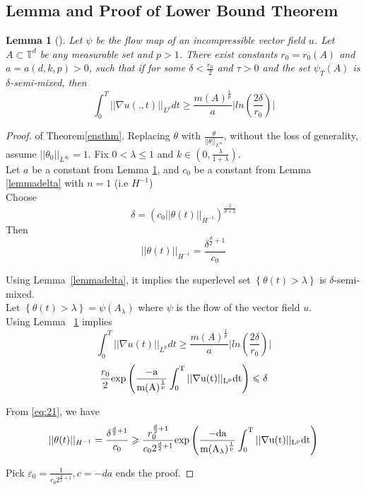 \documentclass[12pt]{report}   %
\renewcommand{\leq}{\leqslant}
\renewcommand{\geq}{\geqslant}
\renewcommand{\epsilon}{\varepsilon}
\numberwithin{equation}{section}
\theoremstyle{plain}
\newtheorem{lemma}{Lemma}[section]
\theoremstyle{definition}
\theoremstyle{remark}
\begin{document}
\subsection{\textbf{Lemma and Proof of Lower Bound Theorem}}
\begin{lemma}[{\cite[Lemma~2.3]{IyerKiselevEA14}}]\label{lemlower}Let $\psi$ be the flow map of an incompressible vector field $u$.
       Let $A\subset\mathbb{T}^d$ be any measurable set and $p > 1$. There exist constants $r_0 = r_0(A)$ and $a = a(d, k, p) > 0$, such that if for some $\delta <\frac{r_0}{2}$ and $\tau > 0$  and the set  $\psi_T{ (A)}$ is $\delta$-semi-mixed, then
       \begin{equation}
       \int_0^T ||\nabla u(.,t)||_{L^p} dt \geq \frac{m(A)^\frac{1}{p}}{a}\biggl\lvert ln\left(\frac{2\delta}{r_0}\right)\biggr\rvert
       \end{equation}
\end{lemma}
\begin{proof}  of  Theorem\ref{ensthm}.
       Replacing $\theta$ with $\frac{\theta}{||\theta||_{L^\infty}}$, without the loss of generality,
       assume $||\theta_0||_{L^\infty} = 1$. Fix $0<\lambda\leq 1$ and $k\in\left(0, \frac{\lambda}{1+\lambda}\right).$ \\
       Let $a$ be a constant from Lemma \ref{lemlower}, and $c_0$ be a constant from Lemma \ref{lemmadelta} with $n = 1$ (i.e $H^{-1}$) \\
       Choose \\
      \[ \delta = (c_0||\theta(t)||_{H^{-1}})^{\frac{2}{d+2}}\]
   Then 
  \begin{equation} 
   ||\theta(t)||_{H^{-1}} = \frac{\delta^{\frac{d}{2}+1}}{c_0} \label{eq:21}
   \end{equation}
   
   Using Lemma~\ref{lemmadelta}, it implies the superlevel set $\left\lbrace \theta(t) > \lambda \right\rbrace$ is $\delta$-semi-mixed.  \\
  Let $\left\lbrace \theta(t) > \lambda \right\rbrace = \psi(A_\lambda)$ where $\psi$ is the flow of the vector field $u$. \\
  Using Lemma ~\ref{lemlower} implies
   \[\int_0^T ||\nabla u(t)||_{L^p} dt \geq \frac{m(A)^\frac{1}{p}}{a}\biggl\lvert ln\left(\frac{2\delta}{r_0}\right)\biggr\rvert\]
   \begin{equation}
    \frac{r_0}{2} \rm{exp}\left(\frac{-a}{m(A)^\frac{1}{p}}\int_0^T ||\nabla u(t)||_{L^p} dt \right) \leq \delta 
   \end{equation}

   From \eqref{eq:21}, we have
   \[ ||\theta(t)||_{H^{-1}} = \frac{\delta^{\frac{d}{2}+1}}{c_0} \geq \frac{r_0^{\frac{d}{2}+1}}{c_0 2^{\frac{d}{2}+1}} \rm{exp}\left(\frac{-da}{m(A_\lambda)^\frac{1}{p}}\int_0^T ||\nabla u(t)||_{L^p}dt \right) \]
   
   Pick $\epsilon_0 = \frac{1}{c_0 2^{\frac{d}{2}+1}}, c = -da$ ends the proof.
\end{proof}
 
\end{document}
